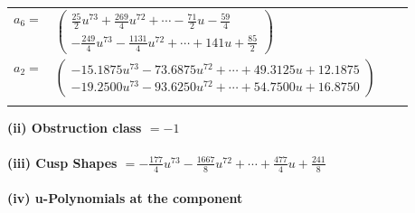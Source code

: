\documentclass[1p]{elsarticle_modified}
\theoremstyle{definition}
\begin{document}
\begin{tabular}{m{7pt} m{180pt} m{7pt} m{180pt} }
\flushright $a_{6}=$&$\begin{pmatrix}\frac{25}{2} u^{73}+\frac{269}{4} u^{72}+\cdots-\frac{71}{2} u-\frac{59}{4}\\-\frac{249}{4} u^{73}-\frac{1131}{4} u^{72}+\cdots+141 u+\frac{85}{2}\end{pmatrix}$ \\
\flushright $a_{2}=$&$\begin{pmatrix}-15.1875 u^{73}-73.6875 u^{72}+\cdots+49.3125 u+12.1875\\-19.2500 u^{73}-93.6250 u^{72}+\cdots+54.7500 u+16.8750\end{pmatrix}$\\&\end{tabular}
\flushleft \textbf{(ii) Obstruction class $= -1$}\\~\\
\flushleft \textbf{(iii) Cusp Shapes $= -\frac{177}{4} u^{73}-\frac{1667}{8} u^{72}+\cdots+\frac{477}{4} u+\frac{241}{8}$}\\~\\
\newpage\renewcommand{\arraystretch}{1}
\flushleft \textbf{(iv) u-Polynomials at the component}\newline \\
\end{document}
